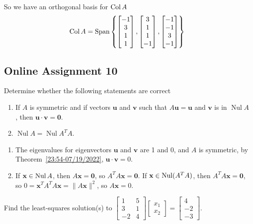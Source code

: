 \documentclass[a4paper,10pt]{article}
\begin{document}
\begin{solution}
So we have an orthogonal basis for $\operatorname{Col} A$
\[
\operatorname{Col} A=\operatorname{Span}\left\{\begin{bmatrix}
-1\\3\\1\\1
\end{bmatrix},\begin{bmatrix}
3\\1\\1\\-1
\end{bmatrix},\begin{bmatrix}
-1\\-1\\3\\-1
\end{bmatrix}\right\}
\]
\end{solution}

\subsection{Online Assignment 10}

\begin{problem}
Determine whether the following statements are correct
\begin{enumerate}[label=\alph*)]
\item If $A$ is symmetric and if vectors $\mathbf u$ and $\mathbf v$ such that $A\mathbf u = \mathbf u$ and $\mathbf v$ is in $\operatorname{Nul}A$, then $\mathbf u \cdot\mathbf v = \mathbf0$.
\item $\operatorname{Nul}A=\operatorname{Nul}A^TA$.
\end{enumerate}
\end{problem}

\begin{solution}
\begin{enumerate}[label=\alph*)]
\item The eigenvalues for eigenvectors $\mathbf u$ and $\mathbf v$ are 1 and 0, and $A$ is symmetric, by Theorem~\ref{23:54-07/19/2022}, $\mathbf u\cdot\mathbf v=0$.
\item If $\mathbf x\in\operatorname{Nul} A$, then $A\mathbf x=\mathbf0$, so $A^TA\mathbf x=\mathbf 0$. If $\mathbf x\in\operatorname{Nul}(A^TA)$, then $A^TA\mathbf x=\mathbf0$, so $0=\mathbf x^TA^TA\mathbf x=\|A\mathbf x\|^2$, so $A\mathbf x=0$.
\end{enumerate}
\end{solution}

\begin{problem}
Find the least-squares solution(s) to $\begin{bmatrix}
1&5\\
3&1\\
-2&4
\end{bmatrix}\begin{bmatrix}
x_1\\x_2
\end{bmatrix}=\begin{bmatrix}
4\\-2\\-3
\end{bmatrix}$.
\end{problem}
\end{document}
